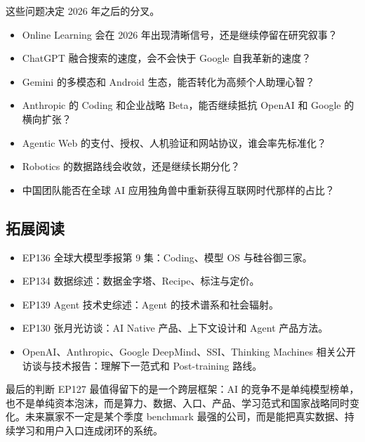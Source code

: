 \documentclass[a4paper]{article}
\begin{document}
这些问题决定 2026 年之后的分叉。

\begin{itemize}
\item Online Learning 会在 2026 年出现清晰信号，还是继续停留在研究叙事？
\item ChatGPT 融合搜索的速度，会不会快于 Google 自我革新的速度？
\item Gemini 的多模态和 Android 生态，能否转化为高频个人助理心智？
\item Anthropic 的 Coding 和企业战略 Beta，能否继续抵抗 OpenAI 和 Google 的横向扩张？
\item Agentic Web 的支付、授权、人机验证和网站协议，谁会率先标准化？
\item Robotics 的数据路线会收敛，还是继续长期分化？
\item 中国团队能否在全球 AI 应用独角兽中重新获得互联网时代那样的占比？
\end{itemize}

\subsection{拓展阅读}

\begin{itemize}
\item EP136 全球大模型季报第 9 集：Coding、模型 OS 与硅谷御三家。
\item EP134 数据综述：数据金字塔、Recipe、标注与定价。
\item EP139 Agent 技术史综述：Agent 的技术谱系和社会辐射。
\item EP130 张月光访谈：AI Native 产品、上下文设计和 Agent 产品方法。
\item OpenAI、Anthropic、Google DeepMind、SSI、Thinking Machines 相关公开访谈与技术报告：理解下一范式和 Post-training 路线。
\end{itemize}

\begin{importantbox}{最后的判断}
EP127 最值得留下的是一个跨层框架：AI 的竞争不是单纯模型榜单，也不是单纯资本泡沫，而是算力、数据、入口、产品、学习范式和国家战略同时变化。未来赢家不一定是某个季度 benchmark 最强的公司，而是能把真实数据、持续学习和用户入口连成闭环的系统。
\end{importantbox}
\end{document}
